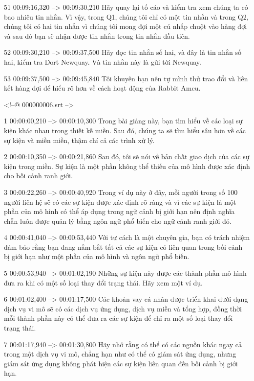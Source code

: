51
00:09:16,320 --> 00:09:30,210
Hãy quay lại tố cáo và kiểm tra xem chúng ta có bao nhiêu tin nhắn.  Vì vậy, trong Q1, chúng tôi chỉ có một tin nhắn và trong Q2, chúng tôi có hai tin nhắn vì chúng tôi mong đợi một cú nhấp chuột vào hàng đợi và sau đó bạn sẽ nhận được tin nhắn trong tin nhắn đầu tiên.

52
00:09:30,210 --> 00:09:37,500
Hãy đọc tin nhắn số hai, và đây là tin nhắn số hai, kiểm tra Dort Newquay.  Và tin nhắn này là gửi tới Newquay.

53
00:09:37,500 --> 00:09:45,840
Tôi khuyên bạn nên tự mình thử trao đổi và liên kết hàng đợi để hiểu rõ hơn về cách hoạt động của Rabbit Amcu.

<!--@ 000000006.srt -->

1
00:00:00,210 --> 00:00:10,300
Trong bài giảng này, bạn tìm hiểu về các loại sự kiện khác nhau trong thiết kế miền.  Sau đó, chúng ta sẽ tìm hiểu sâu hơn về các sự kiện và miền miền, thậm chí cả các trình xử lý.

2
00:00:10,350 --> 00:00:21,860
Sau đó, tôi sẽ nói về bản chất giao dịch của các sự kiện trong miền.  Sự kiện là một phần không thể thiếu của mô hình được xác định cho bối cảnh ranh giới.

3
00:00:22,260 --> 00:00:40,920
Trong ví dụ này ở đây, mỗi người trong số 100 người liên hệ sẽ có các sự kiện được xác định rõ ràng và vì các sự kiện là một phần của mô hình có thể áp dụng trong ngữ cảnh bị giới hạn nên định nghĩa chẵn luôn được quản lý bằng ngôn ngữ phổ biến cho ngữ cảnh ranh giới đó.

4
00:00:41,040 --> 00:00:53,440
Với tư cách là một chuyên gia, bạn có trách nhiệm đảm bảo rằng bạn đang nắm bắt tất cả các sự kiện có liên quan trong bối cảnh bị giới hạn như một phần của mô hình và ngôn ngữ phổ biến.

5
00:00:53,940 --> 00:01:02,190
Những sự kiện này được các thành phần mô hình đưa ra khi có một số loại thay đổi trạng thái.  Hãy xem một ví dụ.

6
00:01:02,400 --> 00:01:17,500
Các khoản vay cá nhân được triển khai dưới dạng dịch vụ vi mô sẽ có các dịch vụ ứng dụng, dịch vụ miền và tổng hợp, đồng thời mỗi thành phần này có thể đưa ra các sự kiện để chỉ ra một số loại thay đổi trạng thái.

7
00:01:17,940 --> 00:01:30,800
Hãy nhớ rằng có thể có các nguồn khác ngay cả trong một dịch vụ vi mô, chẳng hạn như có thể có giám sát ứng dụng, nhưng giám sát ứng dụng không phát hiện các sự kiện liên quan đến bối cảnh bị giới hạn.

